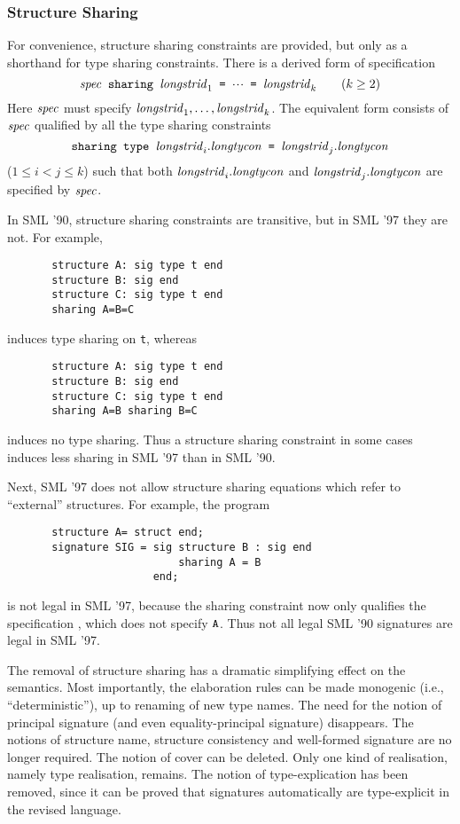 \subsubsection{Structure Sharing}
\label{strsharing.sec}
For convenience, structure sharing constraints are provided,
but only as a shorthand for type sharing constraints. 
There is a derived form of specification
\[
\hbox{\tt ${\it spec}$ sharing ${\it longstrid}_1$ = $\mbox{$\cdot\!\cdot\!\cdot$}$  = ${\it longstrid}_k$}\qquad(k\geq 2)
\]
Here ${\it spec}$ must specify ${\it longstrid}_1,\ldots,{\it longstrid}_k$. 
The equivalent form consists of ${\it spec}$ qualified by all 
the  type sharing constraints 
\[\hbox{\tt sharing type ${\it longstrid}_i.{\it longtycon}$ = 
   ${\it longstrid}_j.{\it longtycon}$}\]
($1\leq i< j\leq k$) such that  both 
${\it longstrid}_i.{\it longtycon}$ and ${\it longstrid}_j.{\it longtycon}$ are specified
by ${\it spec}$.
 

In SML '90, structure sharing constraints are transitive, but
in  SML '97 they are not. For example,
\begin{verbatim}
       structure A: sig type t end
       structure B: sig end
       structure C: sig type t end
       sharing A=B=C
\end{verbatim}
induces type sharing on {\tt t}, whereas 
\begin{verbatim}
       structure A: sig type t end
       structure B: sig end
       structure C: sig type t end
       sharing A=B sharing B=C
\end{verbatim}
induces no type sharing. Thus a structure sharing constraint
in some cases induces less sharing in SML '97 than in SML '90.

Next, SML '97 does not allow structure
sharing equations which refer to ``external'' structures. 
For example, the
program
\begin{verbatim}
       structure A= struct end;
       signature SIG = sig structure B : sig end
                           sharing A = B
                       end;
\end{verbatim}
is not legal in SML '97, because the sharing constraint now only
qualifies the specification , which does
not specify $\hbox{\tt A}$. Thus not all legal SML '90 signatures are
legal in SML '97.

The removal of structure sharing has a dramatic simplifying
effect on the semantics. Most importantly,
the elaboration rules can be made monogenic (i.e., ``deterministic''),
up to renaming of new type names. 
The need for the notion of principal signature (and even 
equality-principal signature) disappears. The notions of structure name, structure consistency
and well-formed signature are no longer required. The notion of cover
can be deleted. Only one kind of realisation, namely type realisation,
remains. The notion of type-explication has been
removed, since it can be proved that signatures automatically are type-explicit
in the revised language.
